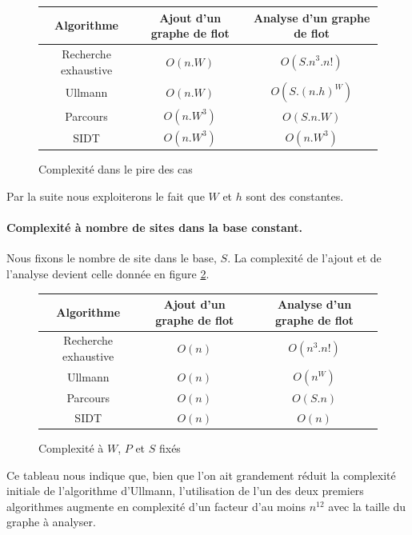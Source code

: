 \begin{figure}[h]
\begin{center}
\begin{tabular}{|c|c|c|}
 \hline
 Algorithme & Ajout d'un graphe de flot & Analyse d'un graphe de flot\\
 \hline
 Recherche exhaustive & $O(n.W)$ & $O(S.n^3.n!)$\\
 Ullmann & $O(n.W)$ & $O(S.(n.h)^W)$ \\
 Parcours & $O(n.W^3)$ & $O(S.n.W)$\\
 SIDT & $O(n.W^3)$ & $O(n.W^3)$\\
 \hline
\end{tabular} 
\end{center}
\caption{Complexité dans le pire des cas}
\label{fig:complexite_1}
\end{figure}

Par la suite nous exploiterons le fait que $W$ et $h$ sont des constantes.

\paragraph{Complexité à nombre de sites dans la base constant.}
Nous fixons le nombre de site dans le base, $S$.
La complexité de l'ajout et de l'analyse devient celle donnée en figure \ref{fig:complexite_2}.

\begin{figure}[h]
\begin{center}
\begin{tabular}{|c|c|c|}
 \hline
 Algorithme & Ajout d'un graphe de flot & Analyse d'un graphe de flot\\
 \hline
 Recherche exhaustive & $O(n)$ & $O(n^3.n!)$\\
 Ullmann & $O(n)$ & $O(n^W)$ \\
 Parcours & $O(n)$ & $O(S.n)$\\
 SIDT & $O(n)$ & $O(n)$\\
 \hline
\end{tabular} 
\end{center}
\caption{Complexité à $W$, $P$ et $S$ fixés}
\label{fig:complexite_2}
\end{figure}

Ce tableau nous indique que, bien que l'on ait grandement réduit la complexité initiale de l'algorithme d'Ullmann, l'utilisation de l'un des deux premiers algorithmes augmente en complexité d'un facteur d'au moins $n^{12}$ avec la taille du graphe à analyser.

